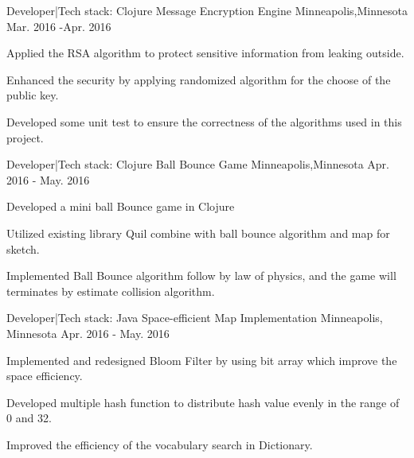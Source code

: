 

\begin{cventries}

  \cventry
    {Developer\enskip|\enskip Tech stack: Clojure} %
    {Message Encryption Engine } %
    {Minneapolis,Minnesota} %
    {Mar. 2016 -Apr. 2016} %
    {
      \begin{cvitems} %
        \item {Applied the RSA algorithm to protect sensitive information from leaking outside.}
        \item {Enhanced the security by applying randomized algorithm for the choose of the public key.}
        \item {Developed some unit test to ensure the correctness of the algorithms used in this project.}
      \end{cvitems}
    }

  \cventry
    {Developer\enskip|\enskip Tech stack: Clojure} %
    {Ball Bounce Game} %
    {Minneapolis,Minnesota} %
    {Apr. 2016 - May. 2016} %
    {
      \begin{cvitems} %
        \item {Developed a mini ball Bounce game in Clojure}
        \item {Utilized existing library Quil combine with ball bounce algorithm and map for sketch.}
        \item{Implemented Ball Bounce algorithm follow by law of physics, and the game will terminates by estimate collision algorithm.}
      \end{cvitems}
    }

  \cventry
    {Developer\enskip|\enskip Tech stack: Java} %
    {Space-efficient Map Implementation} %
    {Minneapolis, Minnesota} %
    {Apr. 2016 - May. 2016} %
    {
      \begin{cvitems} %
        \item {Implemented and redesigned Bloom Filter by using bit array which improve the space efficiency.}
        \item{Developed multiple hash function to distribute hash value evenly in the range of 0 and 32.}
        \item{Improved the efficiency of the vocabulary search in Dictionary.} 
      \end{cvitems} 
    }


\end{cventries}

